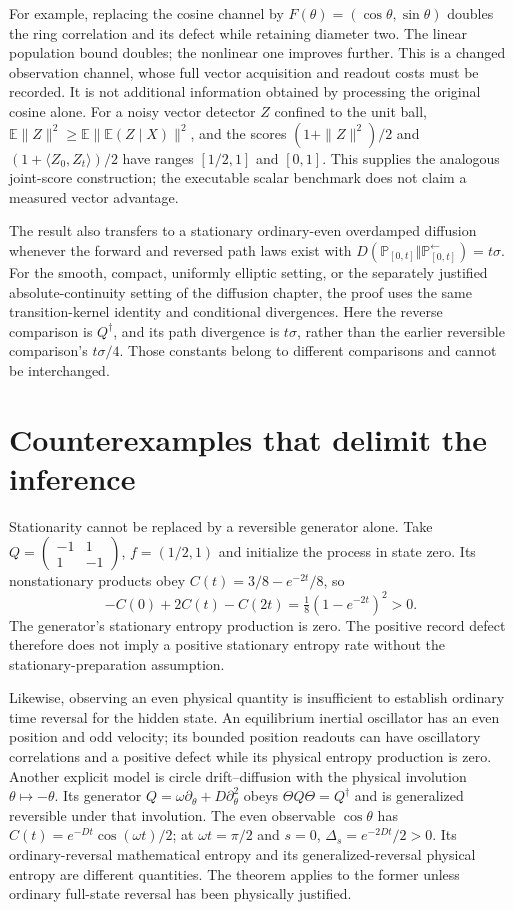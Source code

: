 For example, replacing the cosine channel by
$F(\theta)=(\cos\theta,\sin\theta)$ doubles the ring correlation and
its defect while retaining diameter two. The linear population bound doubles;
the nonlinear one improves further. This is a changed observation channel,
whose full vector acquisition and readout costs must be recorded. It is not
additional information obtained by processing the original cosine alone.
For a noisy vector detector $Z$ confined to the unit ball,
$\mathbb E\|Z\|^2\geq\mathbb E\|\mathbb E(Z\mid X)\|^2$, and the
scores $(1+\|Z\|^2)/2$ and $(1+\langle Z_0,Z_t\rangle)/2$ have ranges
$[1/2,1]$ and $[0,1]$. This supplies the analogous joint-score construction;
the executable scalar benchmark does not claim a measured vector advantage.

The result also transfers to a stationary ordinary-even overdamped diffusion
whenever the forward and reversed path laws exist with
$D(\mathbb P_{[0,t]}\Vert\mathbb P^\leftarrow_{[0,t]})=t\sigma$.
For the smooth, compact, uniformly elliptic setting, or the separately
justified absolute-continuity setting of the diffusion chapter, the proof
uses the same transition-kernel identity and conditional divergences.
Here the reverse comparison is $Q^\dagger$, and its path divergence is
$t\sigma$, rather than the earlier reversible comparison's $t\sigma/4$.
Those constants belong to different comparisons and cannot be interchanged.

\section{Counterexamples that delimit the inference}

Stationarity cannot be replaced by a reversible generator alone. Take
$Q=\left(\begin{smallmatrix}-1&1\\1&-1\end{smallmatrix}\right)$,
$f=(1/2,1)$ and initialize the process in state zero. Its nonstationary
products obey $C(t)=3/8-e^{-2t}/8$, so
\[
 -C(0)+2C(t)-C(2t)=\tfrac18(1-e^{-2t})^2>0.
\]
The generator's stationary entropy production is zero. The positive record
defect therefore does not imply a positive stationary entropy rate without
the stationary-preparation assumption.

Likewise, observing an even physical quantity is insufficient to establish
ordinary time reversal for the hidden state. An equilibrium inertial
oscillator has an even position and odd velocity; its bounded position
readouts can have oscillatory correlations and a positive defect while its
physical entropy production is zero. Another explicit model is circle
drift--diffusion with the physical involution $\theta\mapsto-\theta$.
Its generator $Q=\omega\partial_\theta+D\partial_\theta^2$ obeys
$\Theta Q\Theta=Q^\dagger$ and is generalized reversible under that
involution. The even observable $\cos\theta$ has
$C(t)=e^{-Dt}\cos(\omega t)/2$; at $\omega t=\pi/2$ and $s=0$,
$\Delta_s=e^{-2Dt}/2>0$. Its ordinary-reversal mathematical entropy and
its generalized-reversal physical entropy are different quantities. The
theorem applies to the former unless ordinary full-state reversal has been
physically justified.

